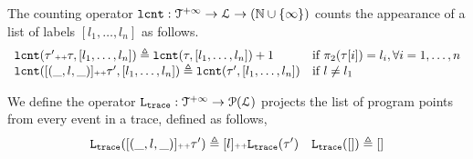 \begin{defn}
  \label{def:lcounter}
  The counting operator $\mathtt{lcnt} : \mathcal{T}^{+\infty} \to \mathcal{L} \to (\mathbb{N} \cup \{\infty\})$
  counts the appearance of a list of labels $[l_1, \ldots, l_n]$ as follows.
\[
  \begin{array}{ll}
  \mathtt{lcnt}(\mathtt{\tau}' {\scriptscriptstyle ++} \mathtt{\tau}, [l_1, \ldots, l_n] ) 
  \triangleq \mathtt{lcnt}(\mathtt{\tau}, [l_1, \ldots, l_n]) + 1  & \text{if}~ \pi_2(\mathtt{\tau}[i]) = l_i, \forall i = 1, \ldots, n
  \\ 
  \mathtt{lcnt}([(\_, l, \_)] {\scriptscriptstyle ++} \mathtt{\tau}', [l_1, \ldots, l_n] ) 
  \triangleq \mathtt{lcnt}(\mathtt{\tau}', [l_1, \ldots, l_n]) & \text{if}~ l \neq l_1
\end{array}
\]
\end{defn}
%
We define the operator $\mathtt{L}_{\mathtt{{trace}}} : \mathcal{T}^{+\infty} \to \mathcal{P}{(\mathcal{L})}$ projects the list of program points from every event in a trace,
defined as follows,
\[
\mathtt{L}_{\mathtt{{trace}}}([(\_, l, \_)] {\scriptscriptstyle ++} \mathtt{\tau}') \triangleq [l] {\scriptscriptstyle ++} \mathtt{L}_{\mathtt{{trace}}}(\mathtt{\tau}')
~~~
\mathtt{L}_{\mathtt{{trace}}}([ ]) \triangleq []
\]
